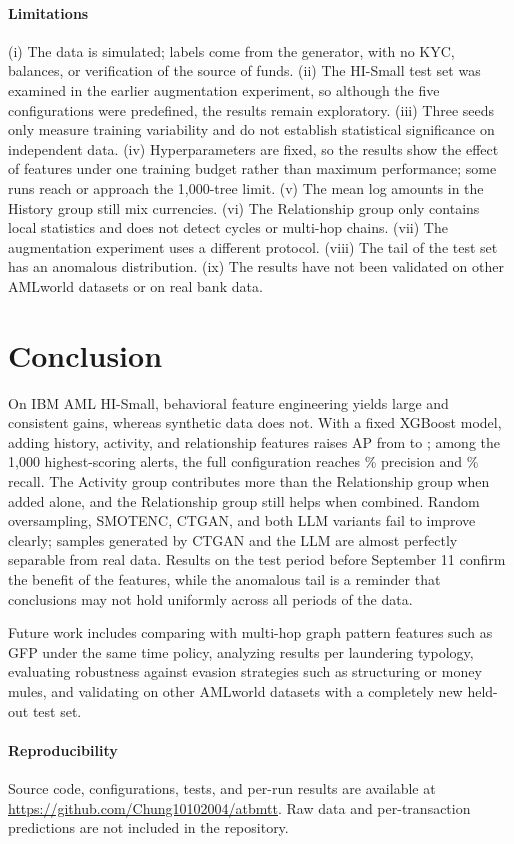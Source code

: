 \documentclass[sigconf,nonacm]{acmart}
\begin{document}
\paragraph{Limitations} (i) The data is simulated; labels come from the generator, with no KYC, balances, or
verification of the source of funds. (ii) The HI-Small test set was examined in the earlier augmentation experiment,
so although the five configurations were predefined, the results remain exploratory. (iii) Three seeds only measure
training variability and do not establish statistical significance on independent data. (iv) Hyperparameters are
fixed, so the results show the effect of features under one training budget rather than maximum performance; some
runs reach or approach the 1,000-tree limit. (v) The mean log amounts in the History group still mix currencies.
(vi) The Relationship group only contains local statistics and does not detect cycles or multi-hop chains. (vii) The
augmentation experiment uses a different protocol. (viii) The tail of the test set has an anomalous distribution.
(ix) The results have not been validated on other AMLworld datasets or on real bank data.

\section{Conclusion}

On IBM AML HI-Small, behavioral feature engineering yields large and consistent gains, whereas synthetic data does
not. With a fixed XGBoost model, adding history, activity, and relationship features raises AP from \FZeroAP{} to
\FFourAP; among the 1,000 highest-scoring alerts, the full configuration reaches \FFourPkPct\% precision and
\FFourRkPct\% recall. The Activity group contributes more than the Relationship group when added alone, and the
Relationship group still helps when combined. Random oversampling, SMOTENC, CTGAN, and both LLM variants fail to
improve clearly; samples generated by CTGAN and the LLM are almost perfectly separable from real data. Results on the
test period before September 11 confirm the benefit of the features, while the anomalous tail is a reminder that
conclusions may not hold uniformly across all periods of the data.

Future work includes comparing with multi-hop graph pattern features such as GFP under the same time policy,
analyzing results per laundering typology, evaluating robustness against evasion strategies such as structuring or
money mules, and validating on other AMLworld datasets with a completely new held-out test set.

\paragraph{Reproducibility} Source code, configurations, tests, and per-run results are available at
\url{https://github.com/Chung10102004/atbmtt}. Raw data and per-transaction predictions are not included in the
repository.



\end{document}
